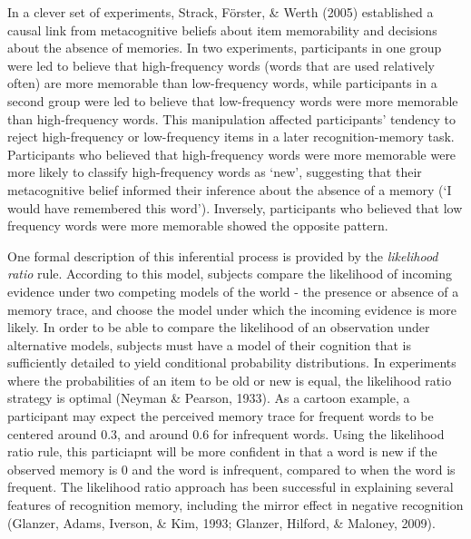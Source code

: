 \documentclass[12pt,twoside]{reedthesis}
\begin{document}
In a clever set of experiments, Strack, Förster, \& Werth (2005) established a causal link from metacognitive beliefs about item memorability and decisions about the absence of memories. In two experiments, participants in one group were led to believe that high-frequency words (words that are used relatively often) are more memorable than low-frequency words, while participants in a second group were led to believe that low-frequency words were more memorable than high-frequency words. This manipulation affected participants' tendency to reject high-frequency or low-frequency items in a later recognition-memory task. Participants who believed that high-frequency words were more memorable were more likely to classify high-frequency words as `new', suggesting that their metacognitive belief informed their inference about the absence of a memory (`I would have remembered this word'). Inversely, participants who believed that low frequency words were more memorable showed the opposite pattern.

One formal description of this inferential process is provided by the \emph{likelihood ratio} rule. According to this model, subjects compare the likelihood of incoming evidence under two competing models of the world - the presence or absence of a memory trace, and choose the model under which the incoming evidence is more likely. In order to be able to compare the likelihood of an observation under alternative models, subjects must have a model of their cognition that is sufficiently detailed to yield conditional probability distributions. In experiments where the probabilities of an item to be old or new is equal, the likelihood ratio strategy is optimal (Neyman \& Pearson, 1933). As a cartoon example, a participant may expect the perceived memory trace for frequent words to be centered around 0.3, and around 0.6 for infrequent words. Using the likelihood ratio rule, this particiapnt will be more confident in that a word is new if the observed memory is 0 and the word is infrequent, compared to when the word is frequent. The likelihood ratio approach has been successful in explaining several features of recognition memory, including the mirror effect in negative recognition (Glanzer, Adams, Iverson, \& Kim, 1993; Glanzer, Hilford, \& Maloney, 2009).
\end{document}
